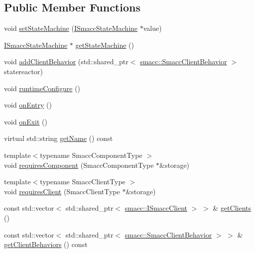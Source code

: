 \subsection*{Public Member Functions}
\begin{DoxyCompactItemize}
\item 
void \hyperlink{classsmacc_1_1IOrthogonal_a4ebfb1945e5b2ad505be791f9e31b843}{set\+State\+Machine} (\hyperlink{classsmacc_1_1ISmaccStateMachine}{I\+Smacc\+State\+Machine} $\ast$value)
\item 
\hyperlink{classsmacc_1_1ISmaccStateMachine}{I\+Smacc\+State\+Machine} $\ast$ \hyperlink{classsmacc_1_1IOrthogonal_a6b48950f01f10e3367bbb74a215bde1e}{get\+State\+Machine} ()
\item 
void \hyperlink{classsmacc_1_1IOrthogonal_a19884fe511c71996759c3fe0d2a41251}{add\+Client\+Behavior} (std\+::shared\+\_\+ptr$<$ \hyperlink{classsmacc_1_1SmaccClientBehavior}{smacc\+::\+Smacc\+Client\+Behavior} $>$ statereactor)
\item 
void \hyperlink{classsmacc_1_1IOrthogonal_ac4821e537ba82244b955b59d99c113e0}{runtime\+Configure} ()
\item 
void \hyperlink{classsmacc_1_1IOrthogonal_a06e10756e7c443261fe6e762c3cc9cc4}{on\+Entry} ()
\item 
void \hyperlink{classsmacc_1_1IOrthogonal_a5ea636328e956baa5e4984a2605c6333}{on\+Exit} ()
\item 
virtual std\+::string \hyperlink{classsmacc_1_1IOrthogonal_a78be582fea6f2c63549982dd9ba925de}{get\+Name} () const 
\item 
{\footnotesize template$<$typename Smacc\+Component\+Type $>$ }\\void \hyperlink{classsmacc_1_1IOrthogonal_a687a76b9c977ab0ded9cd5f242c59234}{requires\+Component} (Smacc\+Component\+Type $\ast$\&storage)
\item 
{\footnotesize template$<$typename Smacc\+Client\+Type $>$ }\\void \hyperlink{classsmacc_1_1IOrthogonal_af1f9cb7aa36255e6bf930613b82ad85c}{requires\+Client} (Smacc\+Client\+Type $\ast$\&storage)
\item 
const std\+::vector$<$ std\+::shared\+\_\+ptr$<$ \hyperlink{classsmacc_1_1ISmaccClient}{smacc\+::\+I\+Smacc\+Client} $>$ $>$ \& \hyperlink{classsmacc_1_1IOrthogonal_aaff8ab3648e4ac8a0fd754d7b3e32611}{get\+Clients} ()
\item 
const std\+::vector$<$ std\+::shared\+\_\+ptr$<$ \hyperlink{classsmacc_1_1SmaccClientBehavior}{smacc\+::\+Smacc\+Client\+Behavior} $>$ $>$ \& \hyperlink{classsmacc_1_1IOrthogonal_a77e33cd30ad3d713289ad96e628ce413}{get\+Client\+Behaviors} () const 

\end{DoxyCompactItemize}
